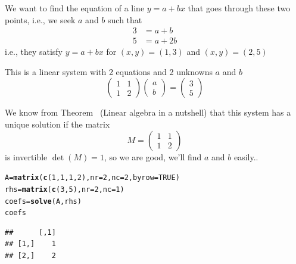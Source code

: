 \documentclass[aspectratio=169]{beamer}\usepackage[]{graphicx}\usepackage[]{xcolor}
\makeatletter
\newcommand{\hlnum}[1]{\textcolor[rgb]{0.686,0.059,0.569}{#1}}%
\newcommand{\hldef}[1]{\textcolor[rgb]{0.345,0.345,0.345}{#1}}%
\newcommand{\hlkwb}[1]{\textcolor[rgb]{0.69,0.353,0.396}{#1}}%
\newcommand{\hlkwc}[1]{\textcolor[rgb]{0.333,0.667,0.333}{#1}}%
\newcommand{\hlkwd}[1]{\textcolor[rgb]{0.737,0.353,0.396}{\textbf{#1}}}%
\newenvironment{kframe}{%
 \def\at@end@of@kframe{}%
 \ifinner\ifhmode%
  \def\at@end@of@kframe{\end{minipage}}%
  \begin{minipage}{\columnwidth}%
 \fi\fi%
 \def\FrameCommand##1{\hskip\@totalleftmargin \hskip-\fboxsep
 \colorbox{shadecolor}{##1}\hskip-\fboxsep
     \hskip-\linewidth \hskip-\@totalleftmargin \hskip\columnwidth}%
 \MakeFramed {\advance\hsize-\width
   \@totalleftmargin\z@ \linewidth\hsize
   \@setminipage}}%
 {\par\unskip\endMakeFramed%
 \at@end@of@kframe}
\newenvironment{knitrout}{}{} %
\makeatother
\begin{document}
\begin{frame}
We want to find the equation of a line $y=a+bx$ that goes through these two points, i.e., we seek $a$ and $b$ such that
$$
\begin{aligned}
3 &= a+b \\
5 &= a+2b
\end{aligned}
$$
i.e., they satisfy $y=a+bx$ for $(x,y)=(1,3)$ and $(x,y)=(2,5)$
\end{frame}

\begin{frame}
This is a linear system with 2 equations and 2 unknowns $a$ and $b$
$$
\begin{pmatrix}
1 & 1 \\ 1 & 2
\end{pmatrix}
\begin{pmatrix}
a \\ b
\end{pmatrix}
=
\begin{pmatrix}
3 \\ 5
\end{pmatrix}
$$
\end{frame}

\begin{frame}[fragile]
We know from Theorem~ (Linear algebra in a nutshell) that this system has a unique solution if the matrix
$$
M=
\begin{pmatrix}
1 & 1 \\ 1 & 2
\end{pmatrix}
$$
is invertible
\vfill
$\det(M)=1$, so we are good, we'll find $a$ and $b$ easily..
\begin{knitrout}
\color{fgcolor}\begin{kframe}
\begin{alltt}
\hldef{A} \hlkwb{=} \hlkwd{matrix}\hldef{(}\hlkwd{c}\hldef{(}\hlnum{1}\hldef{,}\hlnum{1}\hldef{,}\hlnum{1}\hldef{,}\hlnum{2}\hldef{),} \hlkwc{nr} \hldef{=} \hlnum{2}\hldef{,} \hlkwc{nc} \hldef{=} \hlnum{2}\hldef{,} \hlkwc{byrow} \hldef{=} \hlnum{TRUE}\hldef{)}
\hldef{rhs} \hlkwb{=} \hlkwd{matrix}\hldef{(}\hlkwd{c}\hldef{(}\hlnum{3}\hldef{,}\hlnum{5}\hldef{),} \hlkwc{nr} \hldef{=} \hlnum{2}\hldef{,} \hlkwc{nc} \hldef{=}\hlnum{1}\hldef{)}
\hldef{coefs} \hlkwb{=} \hlkwd{solve}\hldef{(A,rhs)}
\hldef{coefs}
\end{alltt}
\begin{verbatim}
##      [,1]
## [1,]    1
## [2,]    2
\end{verbatim}
\end{kframe}
\end{knitrout}
\end{frame}
\end{document}
